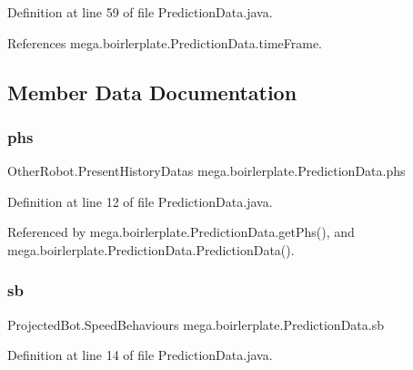 Definition at line 59 of file Prediction\+Data.\+java.



References mega.\+boirlerplate.\+Prediction\+Data.\+time\+Frame.



\subsection{Member Data Documentation}
\mbox{\label{classmega_1_1boirlerplate_1_1_prediction_data_a9c4de05385d226b06ecd248c961da3ca}} 
\subsubsection{\texorpdfstring{phs}{phs}}
{\footnotesize\ttfamily Other\+Robot.\+Present\+History\+Datas mega.\+boirlerplate.\+Prediction\+Data.\+phs\hspace{0.3cm}{\ttfamily [private]}}



Definition at line 12 of file Prediction\+Data.\+java.



Referenced by mega.\+boirlerplate.\+Prediction\+Data.\+get\+Phs(), and mega.\+boirlerplate.\+Prediction\+Data.\+Prediction\+Data().

\mbox{\label{classmega_1_1boirlerplate_1_1_prediction_data_ae99cdcb83dfb8e2c10af0de8f047d99c}} 
\subsubsection{\texorpdfstring{sb}{sb}}
{\footnotesize\ttfamily Projected\+Bot.\+Speed\+Behaviours mega.\+boirlerplate.\+Prediction\+Data.\+sb\hspace{0.3cm}{\ttfamily [private]}}



Definition at line 14 of file Prediction\+Data.\+java.



